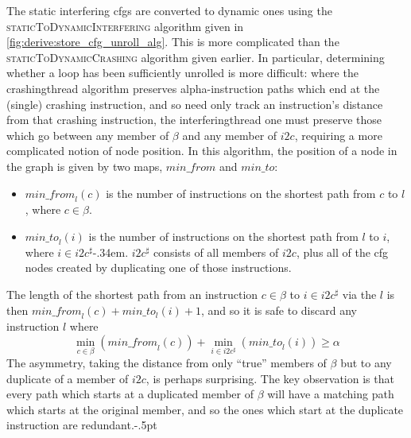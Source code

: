 The static interfering \glspl{cfg} are converted to dynamic ones using
the \textsc{staticToDynamicInterfering} algorithm given in
\autoref{fig:derive:store_cfg_unroll_alg}.  This is more complicated
than the \textsc{staticToDynamicCrashing} algorithm given earlier.  In
particular, determining whether a loop has been sufficiently unrolled
is more difficult: where the \gls{crashingthread} algorithm preserves
\gls{alpha}-instruction paths which end at the (single) \gls{crashing
  instruction}, and so need only track an instruction's distance from
that \gls{crashing instruction}, the \gls{interferingthread} one must
preserve those which go between any member of $\beta$ and any member
of $i2c$, requiring a more complicated notion of node position.  In
this algorithm, the position of a node in the graph is given by two
maps, $\mathit{min\_from}$ and $\mathit{min\_to}$:
\begin{itemize}
\item
  $\mathit{min\_from}_l(c)$ is the number of instructions on the
  shortest path from $c$ to $l$, where $c \in \beta$.
\item
  $\mathit{min\_to}_l(i)$ is the number of instructions on the
  shortest path from $l$ to $i$, where $i \in i2c^\sharp$\kern-.34em.
  $i2c^\sharp$ consists of all members of $i2c$, plus all of the
  \gls{cfg} nodes created by duplicating one of those instructions.
\end{itemize}
The length of the shortest path from an instruction $c
\in \beta$ to $i \in i2c^\sharp$ via the $l$ is then
$\mathit{min\_from}_l(c) + \mathit{min\_to}_l(i) + 1$, and so it is safe
to discard any instruction $l$ where
\begin{displaymath}
\min_{c \in \beta}\left(\mathit{min\_from}_l(c)\right) + \min_{i \in i2c^\sharp}\left(\mathit{min\_to}_l(i)\right) {\geq} \alpha
\end{displaymath}
The asymmetry, taking the distance from only ``true'' members of
$\beta$ but to any duplicate of a member of $i2c$, is perhaps
surprising.  The key observation is that every path which starts at a
duplicated member of $\beta$ will have a matching path which starts at
the original member, and so the ones which start at the duplicate
instruction are redundant.\kern-.5pt

